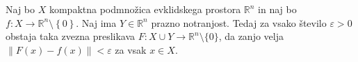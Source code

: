 \documentclass[mat1]{fmfdelo}
\newcommand{\R}{\mathbb R}
\newcommand{\N}{\mathbb N}
\newcommand{\0}{0}
\newcommand{\pU}{\mathcal U}
\begin{document}

\begin{lema}\label{lem:razsiritev-nic}
Naj bo $X$ kompaktna podmnožica evklidskega prostora $\R^n$ in naj bo \mbox{$f : X \to \R^n \setminus \left \{ \0 \right \}$}. Naj ima $Y \in \R^n$ prazno notranjost. Tedaj za vsako število $\varepsilon > 0$ obstaja taka zvezna preslikava $F : X \cup Y \to \R^n \setminus \{0\}$, da zanjo velja $\| F(x) - f(x) \| < \varepsilon$ za vsak $x \in X$.
\end{lema}
\end{document}

